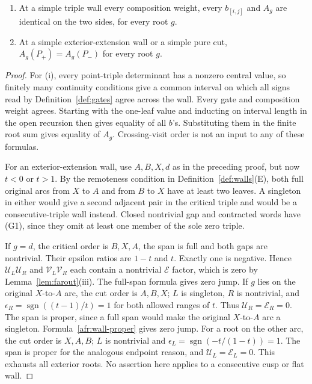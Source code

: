 \begin{theorem}\label{thm:A-R3E}
\begin{enumerate}
\item[(i)] At a simple triple wall every composition weight, every
$b_{[i,j]}$ and $A_g$ are identical on the two sides, for every root $g$.
\item[(ii)] At a simple exterior-extension wall or a simple pure cut,
$A_g(P_+)=A_g(P_-)$ for every root $g$.
\end{enumerate}
\end{theorem}
\begin{proof}
For (i), every point-triple determinant has a nonzero central value,
so finitely many continuity conditions give a common interval on
which all signs read by Definition~\ref{def:gates} agree across the
wall. Every gate and composition weight agrees. Starting with the
one-leaf value and inducting on interval length in the open recursion
then gives equality of all $b$'s. Substituting them in the finite root
sum gives equality of $A_g$. Crossing-visit order is not an input to
any of these formulas.

For an exterior-extension wall, use $A,B,X,d$ as in the preceding
proof, but now $t<0$ or $t>1$. By the remoteness condition in
Definition~\ref{def:walls}(E), both full original arcs from $X$ to
$A$ and from $B$ to $X$ have at least two leaves. A singleton in
either would give a second adjacent pair in the critical triple and
would be a consecutive-triple wall instead. Closed nontrivial gap
and contracted words have (G1), since they omit at least one member
of the sole zero triple.

If $g=d$, the critical order is $B,X,A$, the span is full and both
gaps are nontrivial. Their epsilon ratios are $1-t$ and $t$.
Exactly one is negative. Hence $\mathcal U_L\mathcal U_R$ and
$\mathcal V_L\mathcal V_R$ each contain a nontrivial $\mathcal E$
factor, which is zero by Lemma~\ref{lem:farout}(iii).
The full-span formula gives zero jump.
If $g$ lies on the original $X$-to-$A$ arc, the cut order is $A,B,X$;
$L$ is singleton, $R$ is nontrivial, and
$\epsilon_R=\operatorname{sgn}((t-1)/t)=1$ for both allowed ranges
of $t$. Thus $\mathcal U_R=\mathcal E_R=0$. The span is proper,
since a full span would make the original $X$-to-$A$ arc a singleton.
Formula~\eqref{afr:wall-proper} gives zero jump.
For a root on the other arc, the cut order is $X,A,B$; $L$ is
nontrivial and $\epsilon_L=\operatorname{sgn}(-t/(1-t))=1$.
The span is proper for the analogous endpoint reason, and
$\mathcal U_L=\mathcal E_L=0$. This exhausts all exterior roots.
No assertion here applies to a consecutive cusp or flat wall.


\end{proof}
